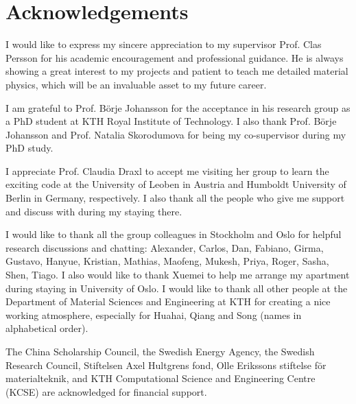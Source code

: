 \documentclass[a4paper, 12pt, titlepage,oneside,drop]{kthesis}
\newcommand\blankpage{%
    \null
    \thispagestyle{empty}%
    \addtocounter{page}{-1}%
    \newpage}
\begin{document}
\newpage
\blankpage


\setcounter{page}{47}


\chapter*{Acknowledgements} 

I would like to express my sincere appreciation to my supervisor Prof. Clas Persson for his academic encouragement and professional guidance. He is always showing a great interest to my projects and patient to teach me detailed
material physics, which will be an invaluable asset to my future career.

I am grateful to Prof. Börje Johansson for the acceptance in his research group as a PhD student at KTH Royal Institute of Technology. I also thank Prof. Börje Johansson and Prof. Natalia Skorodumova for being my co-supervisor during my PhD study.

I appreciate Prof. Claudia Draxl to accept me visiting her group to learn the exciting code at the University of Leoben in Austria and Humboldt University of Berlin in Germany, respectively. I also thank all the people who give me support and
discuss with during my staying there.

I would like to thank all the group colleagues in Stockholm and Oslo for helpful research discussions and chatting: Alexander, Carlos, Dan, Fabiano, Girma, Gustavo, Hanyue, Kristian, Mathias, Maofeng, Mukesh, Priya, Roger, Sasha, Shen, Tiago.
I also would like to thank Xuemei to help me arrange my apartment during staying in University of Oslo. I would like to thank all other people at the Department of Material Sciences and Engineering at KTH for creating a nice working atmosphere,
especially for Huahai, Qiang and Song (names in alphabetical order).

The China Scholarship Council, the Swedish Energy Agency, the Swedish Research Council, Stiftelsen Axel Hultgrens fond,  Olle Erikssons stiftelse för materialteknik, and KTH Computational Science and Engineering Centre (KCSE) 
are acknowledged for financial support.


\newpage
\blankpage


\setcounter{page}{49}






\newpage
\blankpage


\setcounter{page}{57}
\end{document}
